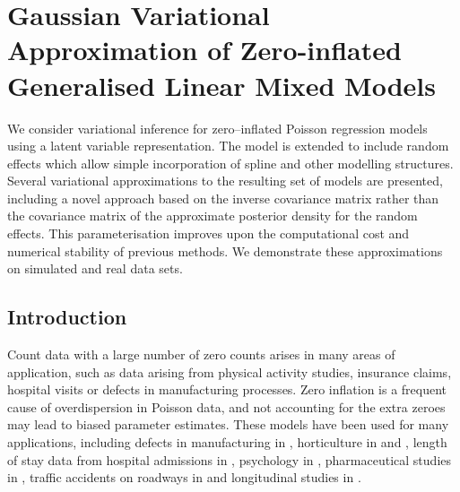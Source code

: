 \chapter{Gaussian Variational Approximation of Zero-inflated Generalised Linear Mixed Models}

\noindent We consider variational inference for zero--inflated Poisson regression models using a latent
variable representation. The model is extended to include random effects which allow simple incorporation of
spline and other modelling structures. Several variational approximations to the resulting set of models are
presented, including a novel approach based on the inverse covariance matrix rather than the covariance matrix
of the approximate posterior density for the random effects. This parameterisation improves upon the
computational cost and numerical stability of previous methods. We demonstrate these approximations on
simulated and real data sets.

\newpage
 


\section{Introduction}
\label{sec:introduction}

Count data with a large number of zero counts arises in many areas of application, such as data arising from
physical activity studies, insurance claims, hospital visits or defects in manufacturing processes. Zero
inflation is a frequent cause of overdispersion in Poisson data, and not accounting for the extra zeroes may
lead to biased parameter estimates. These models have been used for many applications, including defects in
manufacturing in \cite{lambert1992}, horticulture in \cite{BIOM:BIOM1030} and \cite{BIOM:BIOM1030}, length
of stay data from hospital admissions in \cite{BIMJ:BIMJ200390024}, psychology in \cite{JOFP:rethink},
pharmaceutical studies in \cite{Min01042005}, traffic accidents on roadways in \cite{Shankar1997829} and
longitudinal studies in \cite{LeeWangScottYauMcLachlan2006}.

